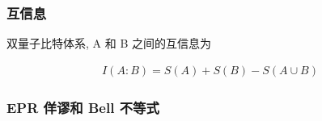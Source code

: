 \documentclass[../../main.tex]{subfiles}
\begin{document}
\subsubsection{互信息}
双量子比特体系, A 和 B 之间的互信息为

\begin{align*}
    I(A:B) = S(A) + S(B) - S(A\cup B)
\end{align*}

\subsubsection{EPR 佯谬和 Bell 不等式}
\end{document}
